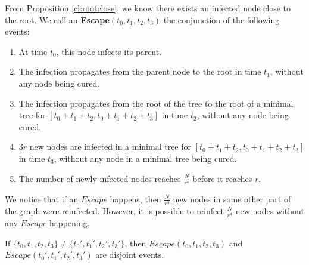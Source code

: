 \begin{definition}
From Proposition \ref{cl:rootclose}, we know there exists an infected node close to the root. We call an \textbf{Escape$(t_0,t_1, t_2, t_3)$} the conjunction of the following events:
\begin{enumerate}
	\item At time $t_0$, this node infects its parent.
	\item The infection propagates from the parent node to the root in time $t_1$, without any node being cured.
	\item The infection propagates from the root of the tree to the root of a minimal tree for $[t_0+t_1+t_2, t_0+t_1+t_2+t_3]$ in time $t_2$, without any node being cured.
	\item $3r$ new nodes are infected in a minimal tree for $[t_0+t_1+t_2, t_0+t_1+t_2+t_3]$ in time $t_3$, without any node in a minimal tree being cured.
	\item The number of newly infected nodes reaches $\frac{N}{r^4}$ before it reaches $r$.
\end{enumerate}
\end{definition}

We notice that if an $Escape$ happens, then $\frac{N}{r^4}$ new nodes in some other part of the graph were reinfected. However, it is possible to reinfect $\frac{N}{r^4}$ new nodes without any $Escape$ happening. 

If $\{t_0, t_1, t_2, t_3\} \neq \{t_0', t_1', t_2', t_3'\}$, then $Escape(t_0, t_1, t_2, t_3)$ and
\\ $Escape(t_0', t_1', t_2', t_3')$  are disjoint events.

